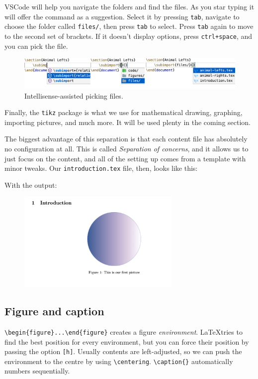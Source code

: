 VSCode will help you navigate the folders and find the files.
As you star typing \verb|| it will offer the command as a suggestion.
Select it by pressing \verb|tab|, navigate to choose the folder called \verb|files/|, then press \verb|tab| to select.
Press \verb|tab| again to move to the second set of brackets. If it doesn't display options, press \verb|ctrl+space|, and you can pick the file.
\begin{figure}[h]
    \centering
    \includegraphics[width=\textwidth]{figures/subimport.png}
    \caption{Intellisense-assisted picking files.}
    \label{fig:animal-lefts}
\end{figure}

Finally, the \verb|tikz| package is what we use for mathematical drawing, graphing, importing pictures, and much more.
It will be used plenty in the coming section.

The biggest advantage of this separation is that each content file has absolutely no configuration at all.
This is called \emph{Separation of concerns}, and it allows us to just focus on the content, and all of the setting up comes from a template with minor tweaks.
Our \verb|introduction.tex| file, then, looks like this:

With the output:
\begin{figure}[h]
    \centering
        \includegraphics[width=0.7\textwidth]{figures/figures.png}
    \label{fig:figures}
\end{figure}

\subsection{Figure and caption}
\verb|\begin{figure}...\end{figure}| creates a figure \emph{environment}.
\LaTeX tries to find the best position for every environment, but you can force their position by passing the option \verb|[h]|.
Usually contents are left-adjusted, so we can push the environment to the centre by using \verb|\centering|.
\verb|\caption{}| automatically numbers sequentially.

